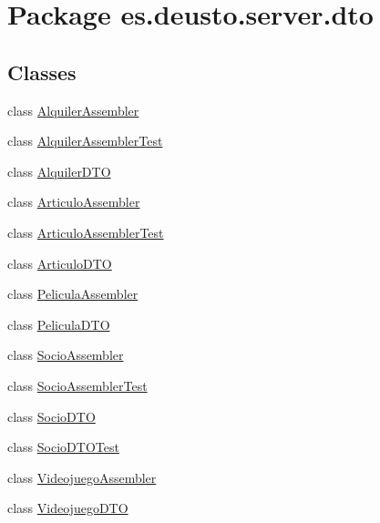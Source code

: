 \hypertarget{namespacees_1_1deusto_1_1server_1_1dto}{}\section{Package es.\+deusto.\+server.\+dto}
\label{namespacees_1_1deusto_1_1server_1_1dto}
\subsection*{Classes}
\begin{DoxyCompactItemize}
\item 
class \mbox{\hyperlink{classes_1_1deusto_1_1server_1_1dto_1_1_alquiler_assembler}{Alquiler\+Assembler}}
\item 
class \mbox{\hyperlink{classes_1_1deusto_1_1server_1_1dto_1_1_alquiler_assembler_test}{Alquiler\+Assembler\+Test}}
\item 
class \mbox{\hyperlink{classes_1_1deusto_1_1server_1_1dto_1_1_alquiler_d_t_o}{Alquiler\+D\+TO}}
\item 
class \mbox{\hyperlink{classes_1_1deusto_1_1server_1_1dto_1_1_articulo_assembler}{Articulo\+Assembler}}
\item 
class \mbox{\hyperlink{classes_1_1deusto_1_1server_1_1dto_1_1_articulo_assembler_test}{Articulo\+Assembler\+Test}}
\item 
class \mbox{\hyperlink{classes_1_1deusto_1_1server_1_1dto_1_1_articulo_d_t_o}{Articulo\+D\+TO}}
\item 
class \mbox{\hyperlink{classes_1_1deusto_1_1server_1_1dto_1_1_pelicula_assembler}{Pelicula\+Assembler}}
\item 
class \mbox{\hyperlink{classes_1_1deusto_1_1server_1_1dto_1_1_pelicula_d_t_o}{Pelicula\+D\+TO}}
\item 
class \mbox{\hyperlink{classes_1_1deusto_1_1server_1_1dto_1_1_socio_assembler}{Socio\+Assembler}}
\item 
class \mbox{\hyperlink{classes_1_1deusto_1_1server_1_1dto_1_1_socio_assembler_test}{Socio\+Assembler\+Test}}
\item 
class \mbox{\hyperlink{classes_1_1deusto_1_1server_1_1dto_1_1_socio_d_t_o}{Socio\+D\+TO}}
\item 
class \mbox{\hyperlink{classes_1_1deusto_1_1server_1_1dto_1_1_socio_d_t_o_test}{Socio\+D\+T\+O\+Test}}
\item 
class \mbox{\hyperlink{classes_1_1deusto_1_1server_1_1dto_1_1_videojuego_assembler}{Videojuego\+Assembler}}
\item 
class \mbox{\hyperlink{classes_1_1deusto_1_1server_1_1dto_1_1_videojuego_d_t_o}{Videojuego\+D\+TO}}
\end{DoxyCompactItemize}
